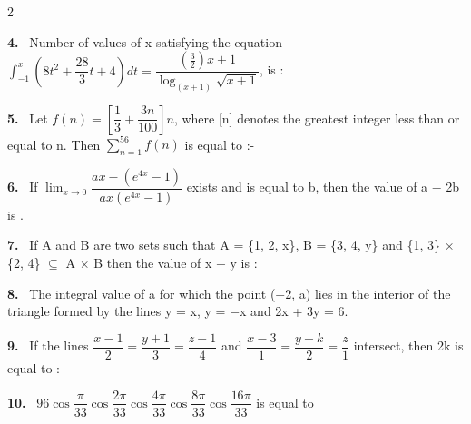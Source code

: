 \documentclass[10pt]{extarticle}
\newcommand{\qn}[1]{\par\smallskip\noindent\textbf{#1.}~}
\begin{document}
\begin{multicols}{2}
\qn{4} Number of values of x satisfying the equation\\
$\displaystyle\int_{-1}^x\left(8t^2+\dfrac{28}3t+4\right)dt=\dfrac{\left(\frac32\right)x+1}{\log_{(x+1)}\sqrt{x+1}}$, is :

\qn{5} Let $f(n)=\left[\dfrac13+\dfrac{3n}{100}\right]n$, where [n] denotes the greatest integer less than or equal to n. Then $\displaystyle\sum_{n=1}^{56}f(n)$ is equal to :-

\qn{6} If $\displaystyle\lim_{x\to0}\dfrac{ax-(e^{4x}-1)}{ax(e^{4x}-1)}$ exists and is equal to b, then the value of a $-$ 2b is \underline{\hspace{1cm}}.

\qn{7} If A and B are two sets such that A = \{1, 2, x\}, B = \{3, 4, y\} and \{1, 3\} $\times$ \{2, 4\} $\subseteq$ A $\times$ B then the value of x + y is :

\qn{8} The integral value of a for which the point ($-$2, a) lies in the interior of the triangle formed by the lines y = x, y = $-$x and 2x + 3y = 6.

\qn{9} If the lines $\dfrac{x-1}2=\dfrac{y+1}3=\dfrac{z-1}4$ and $\dfrac{x-3}1=\dfrac{y-k}2=\dfrac z1$ intersect, then 2k is equal to :

\qn{10} $96\cos\dfrac\pi{33}\cos\dfrac{2\pi}{33}\cos\dfrac{4\pi}{33}\cos\dfrac{8\pi}{33}\cos\dfrac{16\pi}{33}$ is equal to

\end{multicols}
\end{document}
